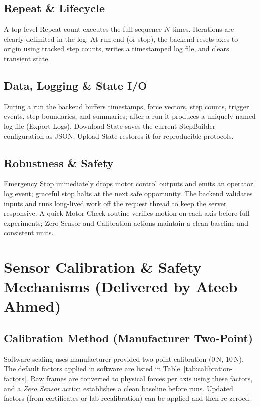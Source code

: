 \documentclass[
    twocolumn,
    fontsize = 10pt,
    parskip = half+,
    headings = small,
    headwidth = text,
    footwidth = text,
]{scrartcl}
\begin{document}
\subsection{Repeat \& Lifecycle}
A top-level Repeat count executes the full sequence $N$ times. Iterations are clearly delimited in the log. At run end (or stop), the backend resets axes to origin using tracked step counts, writes a timestamped log file, and clears transient state.

\subsection{Data, Logging \& State I/O}
During a run the backend buffers timestamps, force vectors, step counts, trigger events, step boundaries, and summaries; after a run it produces a uniquely named log file (Export Logs). Download State saves the current StepBuilder configuration as JSON; Upload State restores it for reproducible protocols.

\subsection{Robustness \& Safety}
Emergency Stop immediately drops motor control outputs and emits an operator log event; graceful stop halts at the next safe opportunity. The backend validates inputs and runs long-lived work off the request thread to keep the server responsive. A quick Motor Check routine verifies motion on each axis before full experiments; Zero Sensor and Calibration actions maintain a clean baseline and consistent units.


\section{Sensor Calibration \& Safety Mechanisms \textnormal{(Delivered by Ateeb Ahmed)}}
\label{sec:calibration}

\subsection{Calibration Method (Manufacturer Two-Point)}
Software scaling uses manufacturer-provided two-point calibration (0\,N, 10\,N). The default factors applied in software are listed in Table~\ref{tab:calibration-factors}. Raw frames are converted to physical forces per axis using these factors, and a \emph{Zero Sensor} action establishes a clean baseline before runs. Updated factors (from certificates or lab recalibration) can be applied and then re-zeroed.
\end{document}
